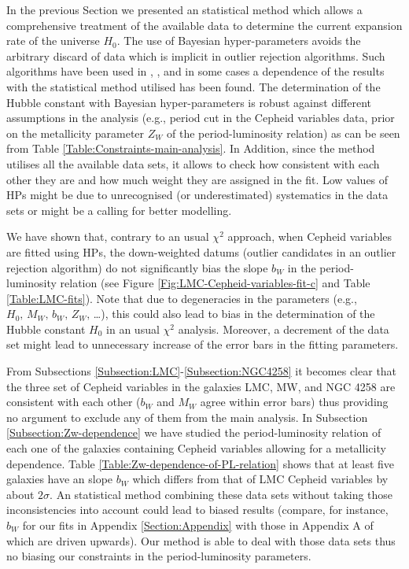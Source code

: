 In the previous Section we presented an statistical method which allows a comprehensive treatment of the available data to determine the current expansion rate of the universe $H_0$. The use of Bayesian hyper-parameters avoids the arbitrary discard of data which is implicit in outlier rejection algorithms. Such algorithms have been used in  \cite{Riess:2009pu}, \cite{Riess:2011yx}, \cite{Efstathiou:2013via} and in some cases a dependence of the results with the statistical method utilised has been found. The determination of the Hubble constant with Bayesian hyper-parameters is robust against different assumptions in the analysis (e.g., period cut in the Cepheid variables data, prior on the metallicity parameter $Z_W$ of the period-luminosity relation) as can be seen from Table \ref{Table:Constraints-main-analysis}. In Addition, since the method utilises all the available data sets, it allows to check how consistent with each other they are and how much weight they are assigned in the fit. Low values of HPs might be due to unrecognised (or underestimated) systematics in the data sets or might be a calling for better modelling.

We have shown that, contrary to an usual $\chi^2$ approach, when Cepheid variables are fitted using HPs, the down-weighted datums (outlier candidates in an outlier rejection algorithm) do not significantly bias the slope $b_W$ in the period-luminosity relation (see Figure \ref{Fig:LMC-Cepheid-variables-fit-c} and Table \ref{Table:LMC-fits}). Note that due to degeneracies in the parameters (e.g., $H_0,\, M_W,\, b_W,\, Z_W,\,$\dots), this could also lead to bias in the determination of the Hubble constant $H_0$ in an usual $\chi^2$ analysis. Moreover, a decrement of the data set might lead to unnecessary increase of the error bars in the fitting parameters.

From Subsections \ref{Subsection:LMC}-\ref{Subsection:NGC4258} it becomes clear that the three set of Cepheid variables in the galaxies LMC, MW, and NGC 4258 are consistent with each other ($b_W$ and $M_W$ agree within error bars) thus providing no argument to exclude any of them from the main analysis. In Subsection \ref{Subsection:Zw-dependence} we have studied the period-luminosity relation of each one of the galaxies containing Cepheid variables allowing for a metallicity dependence. Table \ref{Table:Zw-dependence-of-PL-relation} shows that at least five galaxies have an slope $b_W$ which differs from that of LMC Cepheid variables by about $2\sigma$. An statistical method combining these data sets without taking those inconsistencies into account could lead to biased results (compare, for instance, $b_W$ for our fits in Appendix \ref{Section:Appendix} with those in Appendix A of \cite{Efstathiou:2013via} which are driven upwards). Our method is able to deal with those data sets thus no biasing our constraints in the period-luminosity parameters.

